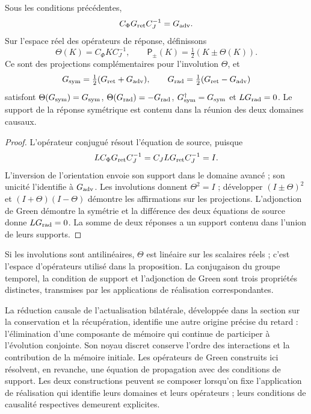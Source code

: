 \begin{proposition}
\label{vii:prop:green-paridades}
Sous les conditions précédentes,
\[
 C_\Phi G_{\rm ret}C_J^{-1}=G_{\rm adv}.
\]
Sur l'espace réel des opérateurs de réponse, définissons
\[
 \Theta(K)=C_\Phi K C_J^{-1},\qquad
 \mathsf P_\pm(K)=\tfrac12(K\pm\Theta(K)).
\]
Ce sont des projections complémentaires pour l'involution \(\Theta\), et
\begin{equation}
 G_{\rm sym}=\tfrac12(G_{\rm ret}+G_{\rm adv}),\qquad
 G_{\rm rad}=\tfrac12(G_{\rm ret}-G_{\rm adv})
 \label{vii:eq:descomposicion-green}
\end{equation}
satisfont \(\Theta(G_{\rm sym})=G_{\rm sym}\),
\(\Theta(G_{\rm rad})=-G_{\rm rad}\),
\(G_{\rm sym}^{\dagger}=G_{\rm sym}\) et
\(LG_{\rm rad}=0\). Le support de la réponse symétrique est contenu
dans la réunion des deux domaines causaux.
\end{proposition}
\begin{proof}
L'opérateur conjugué résout l'équation de source, puisque
\[
 LC_\Phi G_{\rm ret}C_J^{-1}=C_JLG_{\rm ret}C_J^{-1}=I.
\]
L'inversion de l'orientation envoie son support dans le domaine avancé ;
son unicité l'identifie à \(G_{\rm adv}\). Les involutions donnent
\(\Theta^2=I\) ; développer \((I\pm\Theta)^2\) et
\((I+\Theta)(I-\Theta)\) démontre les affirmations sur les projections.
L'adjonction de Green démontre la symétrie et la différence des deux
équations de source donne \(LG_{\rm rad}=0\). La somme de deux réponses
a un support contenu dans l'union de leurs supports.
\end{proof}

Si les involutions sont antilinéaires, \(\Theta\) est linéaire sur les scalaires réels ; c'est l'espace d'opérateurs utilisé dans la proposition. La conjugaison du groupe temporel, la condition de support et l'adjonction de Green sont trois propriétés distinctes, transmises par les applications de réalisation correspondantes.

La réduction causale de l’actualisation bilatérale, développée dans la
section sur la conservation et la récupération, identifie une autre origine précise
du retard : l’élimination d’une composante de mémoire qui continue de
participer à l’évolution conjointe. Son noyau discret conserve
l’ordre des interactions et la contribution de la mémoire initiale.
Les opérateurs de Green construits ici résolvent, en revanche, une
équation de propagation avec des conditions de support. Les deux constructions
peuvent se composer lorsqu’on fixe l’application de réalisation qui identifie
leurs domaines et leurs opérateurs ; leurs conditions de causalité respectives
demeurent explicites.

